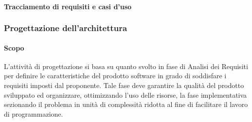 \paragraph{Tracciamento di requisiti e casi d'uso}

\subsubsection{Progettazione dell'architettura}
\paragraph{Scopo}
L'attività di progettazione si basa su quanto svolto in fase di Analisi dei Requisiti per definire le caratteristiche del prodotto software in grado di soddisfare i requisiti imposti dal proponente.  Tale fase deve garantire la qualità del prodotto sviluppato ed organizzare, ottimizzando l'uso delle risorse, la fase implementativa sezionando il problema in unità di complessità ridotta al fine di facilitare il lavoro di programmazione.

